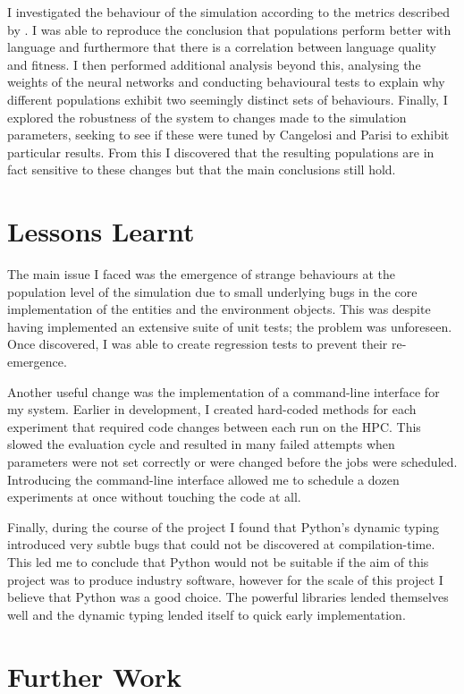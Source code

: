 \documentclass[12pt,a4paper]{report}
\begin{document}
I investigated the behaviour of the simulation according to the metrics described by \citet{Cangelosi1998}. I was able to reproduce the conclusion that populations perform better with language and furthermore that there is a correlation between language quality and fitness. I then performed additional analysis beyond this, analysing the weights of the neural networks and conducting behavioural tests to explain why different populations exhibit two seemingly distinct sets of behaviours. Finally, I explored the robustness of the system to changes made to the simulation parameters, seeking to see if these were tuned by Cangelosi and Parisi to exhibit particular results. From this I discovered that the resulting populations are in fact sensitive to these changes but that the main conclusions still hold.

\section{Lessons Learnt}

The main issue I faced was the emergence of strange behaviours at the population level of the simulation due to small underlying bugs in the core implementation of the entities and the environment objects. This was despite having implemented an extensive suite of unit tests; the problem was unforeseen. Once discovered, I was able to create regression tests to prevent their re-emergence.

Another useful change was the implementation of a command-line interface for my system. Earlier in development, I created hard-coded methods for each experiment that required code changes between each run on the HPC. This slowed the evaluation cycle and resulted in many failed attempts when parameters were not set correctly or were changed before the jobs were scheduled. Introducing the command-line interface allowed me to schedule a dozen experiments at once without touching the code at all.

Finally, during the course of the project I found that Python's dynamic typing introduced very subtle bugs that could not be discovered at compilation-time. This led me to conclude that Python would not be suitable if the aim of this project was to produce industry software, however for the scale of this project I believe that Python was a good choice. The powerful libraries lended themselves well and the dynamic typing lended itself to quick early implementation.

\section{Further Work}
\end{document}

